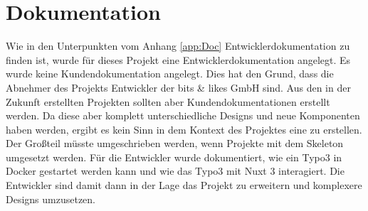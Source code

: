 \section{Dokumentation}
\label{sec:Dokumentation}

Wie in den Unterpunkten vom Anhang \ref{app:Doc} Entwicklerdokumentation zu finden ist, wurde für dieses Projekt eine Entwicklerdokumentation angelegt. Es wurde keine Kundendokumentation angelegt. Dies hat den Grund, dass die Abnehmer des Projekts Entwickler der bits \& likes GmbH sind. Aus den in der Zukunft erstellten Projekten sollten aber Kundendokumentationen erstellt werden. Da diese aber komplett unterschiedliche Designs und neue Komponenten haben werden, ergibt es kein Sinn in dem Kontext des Projektes eine zu erstellen. Der Großteil müsste umgeschrieben werden, wenn Projekte mit dem Skeleton umgesetzt werden. Für die Entwickler wurde dokumentiert, wie ein Typo3 in Docker gestartet werden kann und wie das Typo3 mit Nuxt 3 interagiert. Die Entwickler sind damit dann in der Lage das Projekt zu erweitern und komplexere Designs umzusetzen.